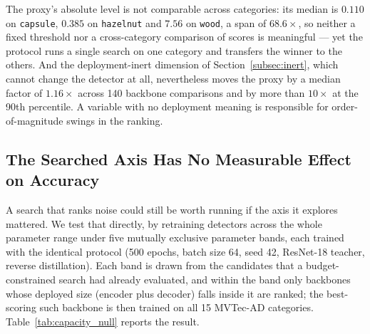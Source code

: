 The proxy's absolute level is not comparable across categories: its median is
$0.110$ on \texttt{capsule}, $0.385$ on \texttt{hazelnut} and $7.56$ on
\texttt{wood}, a span of $68.6\times$, so neither a fixed threshold nor a
cross-category comparison of scores is meaningful --- yet the protocol runs a
single search on one category and transfers the winner to the others. And the
deployment-inert dimension of Section~\ref{subsec:inert}, which cannot change the
detector at all, nevertheless moves the proxy by a median factor of $1.16\times$
across 140 backbone comparisons and by more than $10\times$ at the 90th
percentile. A variable with no deployment meaning is responsible for
order-of-magnitude swings in the ranking.

\subsection{The Searched Axis Has No Measurable Effect on Accuracy}
\label{subsec:capacity_null}

A search that ranks noise could still be worth running if the axis it explores
mattered. We test that directly, by retraining detectors across the whole
parameter range under five mutually exclusive parameter bands, each trained with
the identical protocol (500 epochs, batch size 64, seed 42, ResNet-18 teacher,
reverse distillation). Each band is drawn from the candidates that a
budget-constrained search had already evaluated, and within the band only
backbones whose deployed size (encoder plus decoder) falls inside it are ranked;
the best-scoring such backbone is then trained on all 15 MVTec-AD categories.
Table~\ref{tab:capacity_null} reports the result.

\begin{table}[t]
\centering
\caption{Parameter-capacity bands. Each band restricts the search to backbones
whose deployed size falls inside the band; the selected backbone is then trained
with the identical protocol on all 15 MVTec-AD categories.}
\label{tab:capacity_null}

\end{table}

